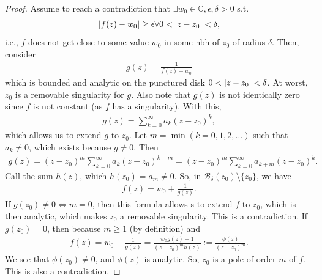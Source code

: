 \documentclass{article}
\theoremstyle{definition}
\newcommand{\f}[2]{\frac{#1}{#2}}
\newcommand{\C}{\mathbb{C}}
\newcommand{\B}{\mathcal{B}}
\begin{document}
\noindent \begin{proof}
	Assume to reach a contradiction that $\exists w_0 \in \C, \epsilon, \delta >0 $ s.t.
	\begin{align}
	\abs{f(z) - w_0} \geq \epsilon \forall 0 < \abs{z-z_0} < \delta,
	\end{align} 
	i.e., $f$ does not get close to some value $w_0$ in some nbh of $z_0$ of radius $\delta$. Then, consider 
	\begin{align}
	g(z) = \f{1}{f(z) - w_0}
	\end{align} 
	which is bounded and analytic on the punctured disk $0 < \abs{z-z_0} < \delta$. At worst, $z_0$ is a removable singularity for $g$. Also note that $g(z)$ is not identically zero since $f$ is not constant (as $f$ has a singularity). With this, 
	\begin{align}
	g(z) = \sum^\infty_{k=0}a_k (z-z_0)^k,
	\end{align}  
	which allows us to extend $g$ to $z_0$. Let $m = \min(k=0,1,2,\dots)$ such that $a_k \neq 0$, which exists because $g\neq 0$. Then
	\begin{align}
	g(z) = (z-z_0)^m\sum^\infty_{k=0}a_k (z-z_0)^{k-m} = (z-z_0)^m\sum^\infty_{k=0}a_{k+m} (z-z_0)^k.
	\end{align}
	Call the sum $h(z)$, which $h(z_0) = a_m \neq 0$. So, in $\B_\delta(z_0)\setminus\{z_0\}$, we have
	\begin{align}
	f(z)  =w_0 + \f{1}{g(z)}.
	\end{align}
	If $g(z_0) \neq 0 \iff m= 0$, then this formula allows s to extend $f$ to $z_0$, which is then analytic, which makes $z_0$ a removable singularity. This is a contradiction. If $g(z_0) = 0$, then because $ m\geq 1$ (by definition) and
	\begin{align}
	f(z) = w_0 + \f{1}{g(z)} = \f{w_0 g(z) + 1}{(z-z_0)^m h(z)} := \f{\phi(z)}{(z - z_0)^m}.
	\end{align} 
	We see that $\phi(z_0) \neq 0$, and $\phi(z)$ is analytic. So, $z_0$ is a pole of order $m$ of $f$. This is also a contradiction. \qedhere
	
\end{proof}
\end{document}
